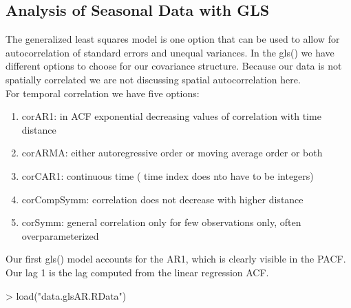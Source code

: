 \documentclass[11pt, a4paper]{article} %
\begin{document}
\subsection{Analysis of Seasonal Data with GLS}

The generalized least squares  model is one option that can be used to allow for autocorrelation of standard errors and unequal variances. In the gls() we have different options to choose for our covariance structure. Because our data is not spatially correlated we are not discussing spatial autocorrelation here.\\

For temporal correlation we have five options:
\begin{enumerate}
\item corAR1: in ACF exponential decreasing values of correlation with time distance\\
\item corARMA: either autoregressive order or moving average order or both\\
\item corCAR1: continuous time ( time index does nto have to be integers)\\
\item corCompSymm: correlation does not decrease with higher distance\\
\item corSymm: general correlation only for few observations only, often overparameterized\\
\end{enumerate}



Our first gls() model accounts for the AR1, which is clearly visible in the PACF. 
Our lag 1 is the lag computed from the linear regression ACF.

\begin{Schunk}
\end{Schunk}

\begin{Schunk}
\begin{Sinput}
> load("data.glsAR.RData")
\end{Sinput}
\end{Schunk}
\end{document}
